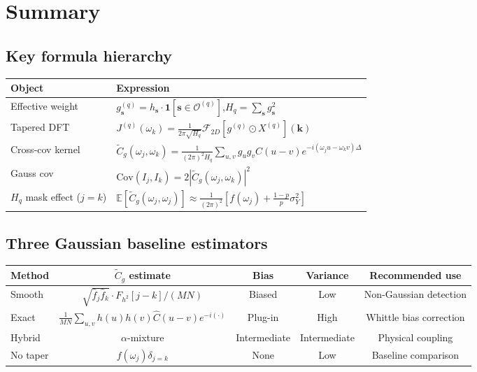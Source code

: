 \documentclass[12pt]{article}
\theoremstyle{definition}
\begin{document}
\section{Summary}
\label{sec:summary}

\subsection{Key formula hierarchy}

\begin{center}
\begin{tabular}{ll}
\toprule
Object & Expression \\
\midrule
Effective weight & $g^{(q)}_\mathbf{s} = h_\mathbf{s}\cdot\mathbf{1}[\mathbf{s}\in\mathcal{O}^{(q)}]$,\quad $H_q=\sum_\mathbf{s}g_\mathbf{s}^2$ \\[4pt]
Tapered DFT & $J^{(q)}(\omega_k) = \frac{1}{2\pi\sqrt{H_q}}\mathcal{F}_{2D}[g^{(q)}\odot X^{(q)}](\mathbf{k})$ \\[4pt]
Cross-cov kernel & $\tilde{C}_g(\omega_j,\omega_k) = \frac{1}{(2\pi)^2 H_q}\sum_{u,v}g_u g_v C(u-v)e^{-i(\omega_j u - \omega_k v)\Delta}$ \\[4pt]
Gauss cov & $\mathrm{Cov}(I_j,I_k) = 2|\tilde{C}_g(\omega_j,\omega_k)|^2$ \\[4pt]
$H_q$ mask effect ($j=k$) & $\mathbb{E}[\tilde{C}_g(\omega_j,\omega_j)] \approx \frac{1}{(2\pi)^2}[f(\omega_j) + \frac{1-p}{p}\sigma^2_Y]$ \\
\bottomrule
\end{tabular}
\end{center}

\subsection{Three Gaussian baseline estimators}

\begin{table}[h!]
\centering
\begin{tabular}{lcccc}
\toprule
Method & $\tilde{C}_g$ estimate & Bias & Variance & Recommended use \\
\midrule
Smooth & $\sqrt{\hat{f}_j\hat{f}_k}\cdot F_{h^2}[j-k]/(MN)$
  & Biased & Low & Non-Gaussian detection \\
Exact & $\frac{1}{MN}\sum_{u,v}h(u)h(v)\hat{C}(u-v)e^{-i(\cdot)}$
  & Plug-in & High & Whittle bias correction \\
Hybrid & $\alpha$-mixture & Intermediate & Intermediate & Physical coupling \\
No taper & $f(\omega_j)\delta_{j=k}$ & None & Low & Baseline comparison \\
\bottomrule
\end{tabular}
\end{table}
\end{document}

